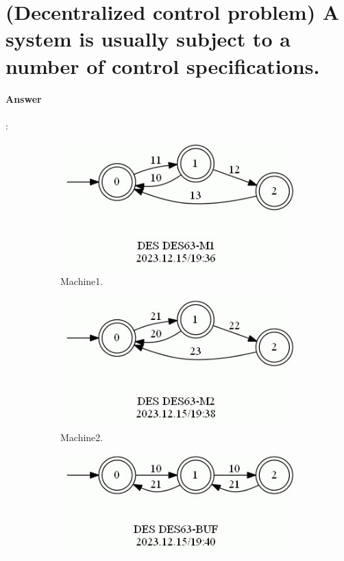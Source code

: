 \documentclass{article}
\begin{document}
\section{(Decentralized control problem) A system is usually subject to a number of control specifications.}

\paragraph{Answer}:


\begin{figure}[h!]
  \centering
  \begin{subfigure}{0.26\linewidth}
    \includegraphics[width=\linewidth]{assets/DES63-M1.jpg}
     \caption{Machine1.}
  \end{subfigure}
  \begin{subfigure}{0.26\linewidth}
    \includegraphics[width=\linewidth]{assets/DES63-M2.jpg}
     \caption{Machine2.}
  \end{subfigure}
  \begin{subfigure}{0.26\linewidth}
    \includegraphics[width=\linewidth]{assets/DES63-BUF.jpg}

\end{subfigure}
\end{figure}
\end{document}
